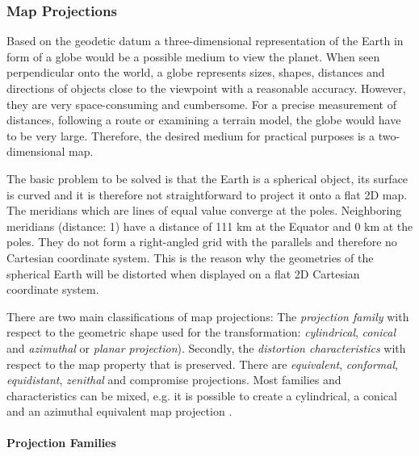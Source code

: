 \subsubsection{Map Projections} %
\label{ssub:map_projections}

Based on the geodetic datum a three-dimensional representation of the Earth in form of a globe would be a possible medium to view the planet. When seen perpendicular onto the world, a globe represents sizes, shapes, distances and directions of objects close to the viewpoint with a reasonable accuracy. However, they are very space-consuming and cumbersome. For a precise measurement of distances, following a route or examining a terrain model, the globe would have to be very large. Therefore, the desired medium for practical purposes is a two-dimensional map.

The basic problem to be solved is that the Earth is a spherical object, its surface is curved and it is therefore not straightforward to project it onto a flat 2D map. The meridians which are lines of equal value converge at the poles. Neighboring meridians (distance: 1\degree) have a distance of 111 km at the Equator and 0 km at the poles. They do not form a right-angled grid with the parallels and therefore no Cartesian coordinate system. This is the reason why the geometries of the spherical Earth will be distorted when displayed on a flat 2D Cartesian coordinate system. \cite[p.79]{bolstad2008gis}


There are two main classifications of map projections: The \emph{projection family} with respect to the geometric shape used for the transformation: \emph{cylindrical}, \emph{conical} and \emph{azimuthal} or \emph{planar projection}). Secondly, the \emph{distortion characteristics} with respect to the map property that is preserved. There are \emph{equivalent}, \emph{conformal}, \emph{equidistant}, \emph{zenithal} and compromise projections. Most families and characteristics can be mixed, e.g. it is possible to create a cylindrical, a conical and an azimuthal equivalent map projection
\cite{mapProjectionKrygier}.


\paragraph{Projection Families} %
\label{subp:projection_families}

